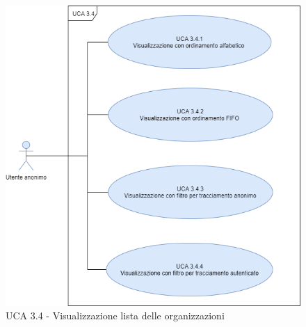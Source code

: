 \begin{figure}[h]
	\centering	
	\includegraphics[scale=0.45, center]{sezioni/UseCase/Immagini/UCA3.4.png}
	\caption{UCA 3.4 - Visualizzazione lista delle organizzazioni}
\end{figure}

